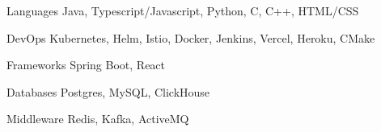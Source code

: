 

\begin{cvskills}

  \cvskill
  {Languages}
  {Java, Typescript/Javascript, Python, C, C++, HTML/CSS}

  \cvskill
  {DevOps}
  {Kubernetes, Helm, Istio, Docker, Jenkins, Vercel, Heroku, CMake}

  \cvskill
  {Frameworks}
  {Spring Boot, React}

  \cvskill
  {Databases}
  {Postgres, MySQL, ClickHouse}

  \cvskill
  {Middleware}
  {Redis, Kafka, ActiveMQ}

\end{cvskills}
